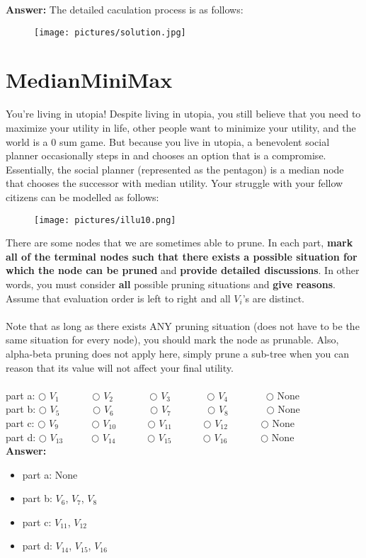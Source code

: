\documentclass{article}
\begin{document}
\textbf{Answer:} The detailed caculation process is as follows:

\begin{figure}[h]
\centering
\texttt{[image: pictures/solution.jpg]}
\end{figure}


\newpage
\section{MedianMiniMax}

You’re living in utopia! Despite living in utopia, you still believe that you need to maximize your utility in life, other people want to minimize your utility, and the world is a 0 sum game. But because you live in utopia, a benevolent social planner occasionally steps in and chooses an option that is a compromise. Essentially, the social planner (represented as the pentagon) is a median node that chooses the successor with median utility. Your struggle with your fellow citizens can be modelled as follows:
\begin{figure}[h]
\centering
\texttt{[image: pictures/illu10.png]}
\end{figure}

\noindent There are some nodes that we are sometimes able to prune. In each part, \textbf{mark all of the terminal nodes such that there exists a possible situation for which the node can be pruned} and \textbf{provide detailed discussions}. In other words, you must consider \textbf{all} possible pruning situations and \textbf{give reasons}. Assume that evaluation order is left to right and all $V_i$’s are distinct.\\
~\\


\noindent Note that as long as there exists ANY pruning situation (does not have to be the same situation for every node), you should mark the node as prunable. Also, alpha-beta pruning does not apply here, simply prune a sub-tree when you can reason that its value will not affect your final utility.\\
~\\


\noindent part a: $\bigcirc$ $V_1$  ~~~~~~$\bigcirc$ $V_2$  ~~~~~~ $\bigcirc$ $V_3$  ~~~~~~ $\bigcirc$ $V_4$ ~~~~~~~$\bigcirc$ None\\
\noindent part b: $\bigcirc$ $V_5$  ~~~~~~$\bigcirc$ $V_6$  ~~~~~~ $\bigcirc$ $V_7$  ~~~~~~ $\bigcirc$ $V_8$ ~~~~~~~$\bigcirc$ None \\
\noindent part c: $\bigcirc$ $V_9$  ~~~~~~$\bigcirc$ $V_{10}$  ~~~~~ $\bigcirc$ $V_{11}$  ~~~~~ $\bigcirc$ $V_{12}$ ~~~~~~$\bigcirc$ None \\
\noindent part d: $\bigcirc$ $V_{13}$  ~~~~~$\bigcirc$ $V_{14}$  ~~~~~ $\bigcirc$ $V_{15}$  ~~~~~ $\bigcirc$ $V_{16}$~~~~~~ $\bigcirc$ None \\

\textbf{Answer:}

\begin{itemize}
    \item part a: None
    
    \item part b: $V_6$, $V_7$, $V_8$
    
    \item part c: $V_{11}$, $V_{12}$
    
    \item part d: $V_{14}$, $V_{15}$, $V_16$
\end{itemize}
\end{document}
